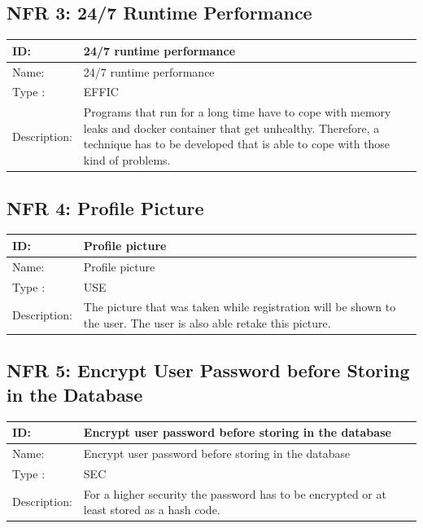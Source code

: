 \documentclass[12pt]{article}
\theoremstyle{definition}
\begin{document}
\subsection{NFR 3: 24/7 Runtime Performance}
\begin{tabular}{|p{.2\linewidth}|p{.65\linewidth}|}
\hline 
ID: & 24/7 runtime performance \\ \hline
Name: & 24/7 runtime performance \\ \hline
Type	: & EFFIC\\ \hline
Description: & Programs that run for a long time have to cope with memory leaks and docker container that get unhealthy. Therefore, a technique has to be developed that is able to cope with those kind of problems.\\ \hline
\end{tabular}

\subsection{NFR 4: Profile Picture}
\begin{tabular}{|p{.2\linewidth}|p{.65\linewidth}|}
\hline 
ID: & Profile picture \\ \hline
Name: & Profile picture \\ \hline
Type	: & USE\\ \hline
Description: & The picture that was taken while registration will be shown to the user. The user is also able retake this picture.\\ \hline
\end{tabular}

\subsection{NFR 5: Encrypt User Password before Storing in the Database}
\begin{tabular}{|p{.2\linewidth}|p{.65\linewidth}|}
\hline 
ID: & Encrypt user password before storing in the database \\ \hline
Name: & Encrypt user password before storing in the database \\ \hline
Type	: & SEC\\ \hline
Description: & For a higher security the password has to be encrypted or at least stored as a hash code. \\ \hline
\end{tabular}
\end{document}
